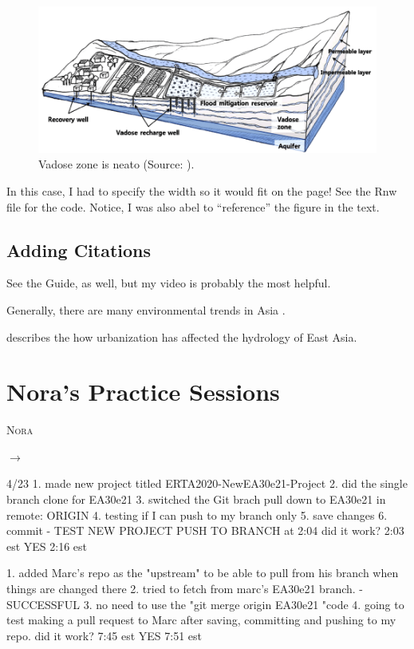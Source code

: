 \documentclass{book}\usepackage{knitr}
\makeatletter
\newcommand{\chapterauthor}[1]{%
  {\parindent0pt\vspace*{-25pt}%
  \linespread{1.1}\large\scshape#1%
  \par\nobreak\vspace*{35pt}}
  \@afterheading%
}
\makeatother
\begin{document}
\begin{knitrout}
\begin{kframe}
\begin{figure}
\includegraphics[width=\linewidth]{images/Lee-Vadose}
\caption{Vadose zone is neato (Source: \citet{lee2017fifty}).}
\label{fig:vadose}
\end{figure}

In this case, I had to specify the width so it would fit on the page!  See the Rnw file for the code. Notice, I was also abel to ``reference'' the figure in the text.

\section{Adding Citations}

See the Guide, as well, but my video is probably the most helpful.


Generally, there are many environmental trends in Asia \citep{imura2005urban}.

\citet{imura2005urban} describes the how urbanization has affected the hydrology of East Asia. 
 

\chapter{Nora's Practice Sessions}

\chapterauthor{Nora}

$\rightarrow$

4/23
1. made new project titled ERTA2020-NewEA30e21-Project
2. did the single branch clone for EA30e21
3. switched the Git brach pull down to EA30e21 in remote: ORIGIN
4. testing if I can push to my branch only 
5. save changes
6. commit - TEST NEW PROJECT PUSH TO BRANCH at 2:04
      did it work? 2:03 est
      YES 2:16 est


1. added Marc's repo as the "upstream" to be able to pull from his branch when things are changed there
2. tried to fetch from marc's EA30e21 branch. - SUCCESSFUL
3. no need to use the "git merge origin EA30e21 "code
4. going to test making a pull request to Marc after saving, committing and pushing to my repo. 
    did it work? 7:45 est
    YES 7:51 est


\end{kframe}
\end{knitrout}
\end{document}
